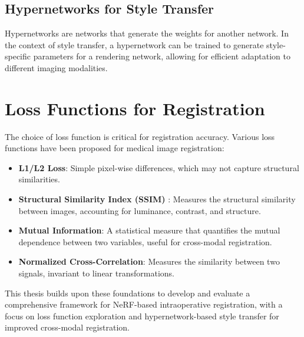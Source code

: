 \subsection{Hypernetworks for Style Transfer}
Hypernetworks are networks that generate the weights for another network. In the context of style transfer, a hypernetwork can be trained to generate style-specific parameters for a rendering network, allowing for efficient adaptation to different imaging modalities.

\section{Loss Functions for Registration}
The choice of loss function is critical for registration accuracy. Various loss functions have been proposed for medical image registration:

\begin{itemize}
    \item \textbf{L1/L2 Loss}: Simple pixel-wise differences, which may not capture structural similarities.
    
    \item \textbf{Structural Similarity Index (SSIM)} \cite{wang2004image}: Measures the structural similarity between images, accounting for luminance, contrast, and structure.
    
    \item \textbf{Mutual Information}: A statistical measure that quantifies the mutual dependence between two variables, useful for cross-modal registration.
    
    \item \textbf{Normalized Cross-Correlation}: Measures the similarity between two signals, invariant to linear transformations.
\end{itemize}

This thesis builds upon these foundations to develop and evaluate a comprehensive framework for NeRF-based intraoperative registration, with a focus on loss function exploration and hypernetwork-based style transfer for improved cross-modal registration. 